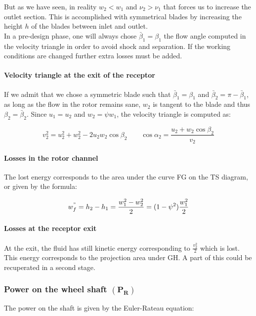But as we have seen, in reality $w_2<w_1$ and $\nu_2>\nu_1$ that forces us to increase the outlet section. This is accomplished with symmetrical blades by increasing the height $h$ of the blades between inlet and outlet. \\

 In a pre-design phase, one will always chose $\bar{\beta}_1 = \beta _1$ the flow angle computed in the velocity triangle in order to avoid shock and separation. If the working conditions are changed further extra losses must be added. 
 
\paragraph{Velocity triangle at the exit of the receptor}
If we admit that we chose a symmetric blade such that $\bar{\beta}_1 = \beta _1 $ and $\bar{\beta}_2 = \pi - \bar{\beta}_1$, as long as the flow in the rotor remains sane, $w_2$ is tangent to the blade and thus $\beta _2 = \bar{\beta}_2$. Since $u_1 = u_2$ and $w_2 = \psi w_1$, the velocity triangle is computed as: 

\begin{equation}
v_2 ^2 = u_2^2+w_2^2 - 2u_2w_2\cos \beta _2 \qquad \cos \alpha _2 = \frac{u_2+ w_2\cos \beta _2}{v_2}
\end{equation}

\paragraph{Losses in the rotor channel}
The lost energy corresponds to the area under the curve FG on the TS diagram, or given by the formula: 

\begin{equation}
w^"_f = h_2 - h_1 = \frac{w_1^2 - w_2^2}{2} =(1-\psi^2) \frac{w_1^2}{2}
\end{equation}

\paragraph{Losses at the receptor exit}
At the exit, the fluid has still kinetic energy corresponding to $\frac{v^2_2}{2}$ which is lost. This energy corresponds to the projection area under GH. A part of this could be recuperated in a second stage. 

\subsubsection{Power on the wheel shaft $\bm{(P_R)}$}
The power on the shaft is given by the Euler-Rateau equation: 

